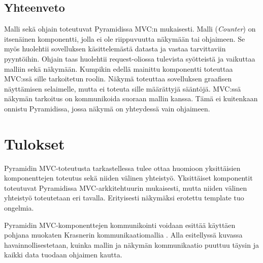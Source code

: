 \documentclass[finnish,utf8,nonumbib,palatino,kandi]{gradu2}
\begin{document}
\subsection{Yhteenveto}
Malli sekä ohjain toteutuvat Pyramidissa MVC:n mukaisesti. Malli (\emph{Counter}) on itsenäinen komponentti, jolla ei ole riippuvuutta näkymään tai ohjaimeen. Se myös huolehtii sovelluksen käsittelemästä datasta ja vastaa tarvittaviin pyyntöihin. Ohjain taas huolehtii request-oliossa tulevista syötteistä ja vaikuttaa malliin sekä näkymään.  Kumpikin edellä mainittu komponentti toteuttaa MVC:ssä sille tarkoitetun roolin. Näkymä toteuttaa sovelluksen graafisen näyttämisen selaimelle, mutta ei toteuta sille määrättyjä sääntöjä. MVC:ssä näkymän tarkoitus on kommunikoida suoraan mallin kanssa. Tämä ei kuitenkaan onnistu Pyramidissa, jossa näkymä on yhteydessä vain ohjaimeen. 

\section{Tulokset}
Pyramidin MVC-toteutusta tarkastellessa tulee ottaa huomioon yksittäisien komponenttejen toteutus sekä niiden välinen yhteistyö. Yksittäiset komponentit toteutuvat Pyramidissa MVC-arkkitehtuurin mukaisesti, mutta niiden välinen yhteistyö
toteutetaan eri tavalla. Erityisesti näkymäksi erotettu template tuo ongelmia. 

Pyramidin MVC-komponenttejen kommunikointi voidaan esittää käyttäen pohjana muokaten Krasnerin kommunikaatiomallia \cite{Krasner:desc}. 
Alla esitellyssä kuvassa havainnollisestetaan, kuinka mallin ja näkymän kommunikaatio puuttuu täysin ja kaikki data tuodaan ohjaimen kautta.
\end{document}
